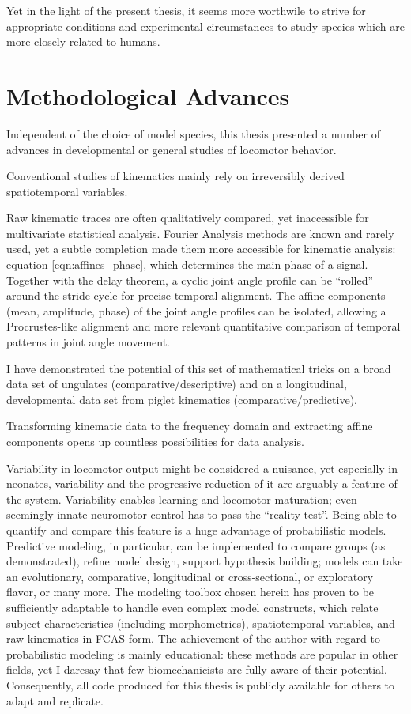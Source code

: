 Yet in the light of the present thesis, it seems more worthwile to strive for appropriate conditions and experimental circumstances to study species which are more closely related to humans.


\section{Methodological Advances}
\label{sec:orgf289d33}
Independent of the choice of model species, this thesis presented a number of advances in developmental or general studies of locomotor behavior.

\bigskip
Conventional studies of kinematics mainly rely on irreversibly derived spatiotemporal variables.

Raw kinematic traces are often qualitatively compared, yet inaccessible for multivariate statistical analysis.
Fourier Analysis methods are known and rarely used, yet a subtle completion made them more accessible for kinematic analysis: equation \eqref{eqn:affines_phase}, which determines the main phase of a signal.
Together with the delay theorem, a cyclic joint angle profile can be ``rolled'' around the stride cycle for precise temporal alignment.
The affine components (mean, amplitude, phase) of the joint angle profiles can be isolated, allowing a Procrustes-like alignment and more relevant quantitative comparison of temporal patterns in joint angle movement.

I have demonstrated the potential of this set of mathematical tricks on a broad data set of ungulates (comparative/descriptive) and on a longitudinal, developmental data set from piglet kinematics (comparative/predictive).


\bigskip
Transforming kinematic data to the frequency domain and extracting affine components opens up countless possibilities for data analysis.

Variability in locomotor output might be considered a nuisance, yet especially in neonates, variability and the progressive reduction of it are arguably a feature of the system.
Variability enables learning and locomotor maturation; even seemingly innate neuromotor control has to pass the ``reality test''.
Being able to quantify and compare this feature is a huge advantage of probabilistic models.
Predictive modeling, in particular, can be implemented to compare groups (as demonstrated), refine model design, support hypothesis building; models can take an evolutionary, comparative, longitudinal or cross-sectional, or exploratory flavor, or many more.
The modeling toolbox chosen herein has proven to be sufficiently adaptable to handle even complex model constructs, which relate subject characteristics (including morphometrics), spatiotemporal variables, and raw kinematics in FCAS form.
The achievement of the author with regard to probabilistic modeling is mainly educational: these methods are popular in other fields, yet I daresay that few biomechanicists are fully aware of their potential.
Consequently, all code produced for this thesis is publicly available for others to adapt and replicate.

